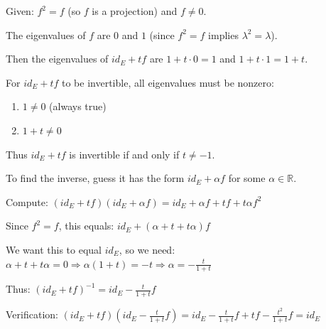 \documentclass[12pt]{article}
\begin{document}
\begin{correctionbox}
Given: $f^2 = f$ (so $f$ is a projection) and $f \ne 0$.

The eigenvalues of $f$ are $0$ and $1$ (since $f^2 = f$ implies $\lambda^2 = \lambda$).

Then the eigenvalues of $id_E + tf$ are $1 + t\cdot 0 = 1$ and $1 + t\cdot 1 = 1 + t$.

For $id_E + tf$ to be invertible, all eigenvalues must be nonzero:
\begin{enumerate}
    \item $1 \ne 0$ (always true)
    \item $1 + t \ne 0$
\end{enumerate}

Thus $id_E + tf$ is invertible if and only if $t \ne -1$.

To find the inverse, guess it has the form $id_E + \alpha f$ for some $\alpha \in \mathbb{R}$.

Compute: $(id_E + tf)(id_E + \alpha f) = id_E + \alpha f + tf + t\alpha f^2$

Since $f^2 = f$, this equals: $id_E + (\alpha + t + t\alpha)f$

We want this to equal $id_E$, so we need:
$\alpha + t + t\alpha = 0 \Rightarrow \alpha(1 + t) = -t \Rightarrow \alpha = -\frac{t}{1+t}$

Thus: $(id_E + tf)^{-1} = id_E - \frac{t}{1+t}f$

Verification: $(id_E + tf)\left(id_E - \frac{t}{1+t}f\right) = id_E - \frac{t}{1+t}f + tf - \frac{t^2}{1+t}f = id_E$
\end{correctionbox}
\end{document}

